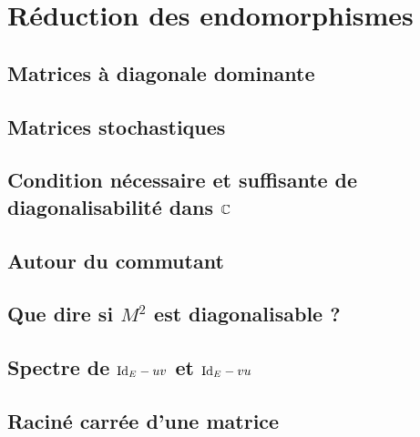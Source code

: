 \chapter{Réduction des endomorphismes}



\newpage

\section{Matrices à diagonale dominante}


\section{Matrices stochastiques}


\section{Condition nécessaire et suffisante de diagonalisabilité dans \texorpdfstring{$\mathbb{C}$}{C}}


\section{Autour du commutant}


\section{Que dire si \texorpdfstring{$M^2$}{M^2} est diagonalisable ?}


\section{Spectre de \texorpdfstring{$\mathrm{Id}_E-uv$ et $\mathrm{Id}_E-vu$}{IdE-uv et IdE - vu}} \label{spectre_I-uv_et_I-vu}


\section{Raciné carrée d'une matrice}


